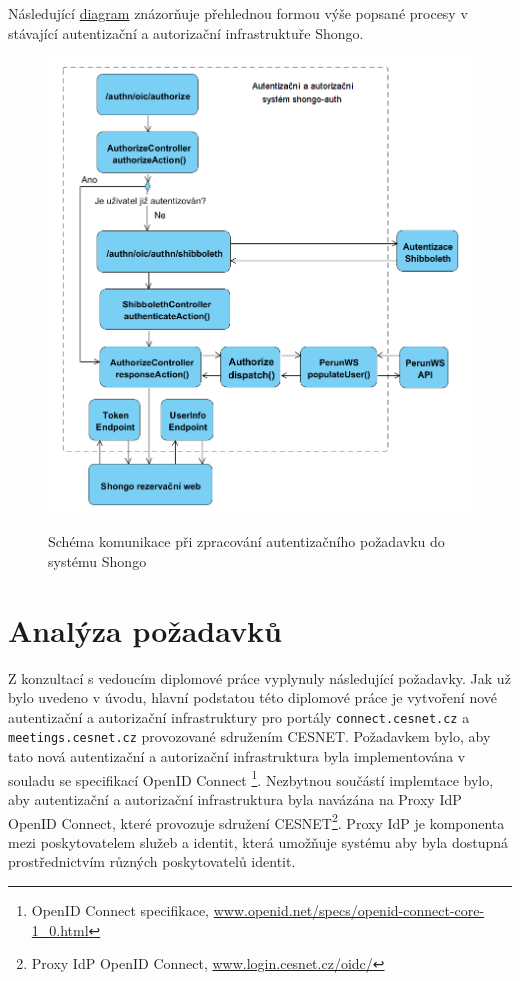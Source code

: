 \documentclass[
  printed, %
  twoside, %
  table,   %
  nolof,     %
  nolot,     %
]{fithesis3}
\begin{document}
Následující \hyperref[fig:shongoAuthnProcess]{diagram} znázorňuje přehlednou formou výše popsané procesy v stávající autentizační a autorizační infrastruktuře Shongo. 

\begin{figure}[H]
\caption{Schéma komunikace při zpracování autentizačního požadavku do systému Shongo}
\centering
\includegraphics[width=12.8cm]{pics/shongoAuthSystem} 
\label{fig:shongoAuthnProcess}
\end{figure}
\par 


\section{Analýza požadavků}
Z konzultací s vedoucím diplomové práce vyplynuly následující požadavky. Jak už bylo uvedeno v úvodu, hlavní podstatou této diplomové práce je vytvoření nové autentizační a autorizační infrastruktury pro portály \texttt{connect.cesnet.cz} a \texttt{meetings.cesnet.cz} provozované sdružením CESNET. Požadavkem bylo, aby tato nová autentizační a autorizační infrastruktura byla implementována v souladu se specifikací OpenID Connect  \footnote{OpenID Connect specifikace, \url{www.openid.net/specs/openid-connect-core-1_0.html}}. Nezbytnou součástí implemtace bylo, aby autentizační a autorizační infrastruktura byla navázána na Proxy IdP OpenID Connect, které provozuje sdružení CESNET\footnote{Proxy IdP OpenID Connect, \url{www.login.cesnet.cz/oidc/}}. Proxy IdP je komponenta mezi poskytovatelem služeb a identit, která umožňuje systému aby byla dostupná prostřednictvím různých poskytovatelů identit. \par
\end{document}
